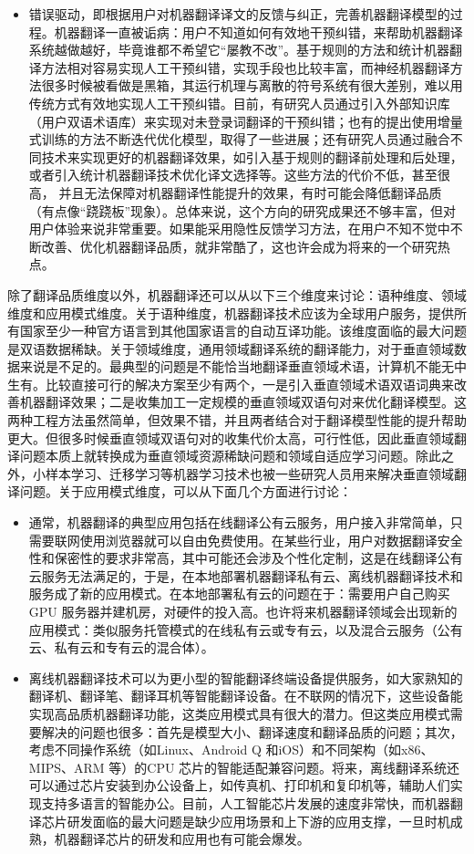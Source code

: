 \begin{spacing}{1.18}
\begin{itemize}
\item 错误驱动，即根据用户对机器翻译译文的反馈与纠正，完善机器翻译模型的过程。机器翻译一直被诟病：用户不知道如何有效地干预纠错，来帮助机器翻译系统越做越好，毕竟谁都不希望它“屡教不改”。基于规则的方法和统计机器翻译方法相对容易实现人工干预纠错，实现手段也比较丰富，而神经机器翻译方法很多时候被看做是黑箱，其运行机理与离散的符号系统有很大差别，难以用传统方式有效地实现人工干预纠错。目前，有研究人员通过引入外部知识库（用户双语术语库）来实现对未登录词翻译的干预纠错；也有的提出使用增量式训练的方法不断迭代优化模型，取得了一些进展；还有研究人员通过融合不同技术来实现更好的机器翻译效果，如引入基于规则的翻译前处理和后处理，或者引入统计机器翻译技术优化译文选择等。这些方法的代价不低，甚至很高， 并且无法保障对机器翻译性能提升的效果，有时可能会降低翻译品质（有点像“跷跷板”现象）。总体来说，这个方向的研究成果还不够丰富，但对用户体验来说非常重要。如果能采用隐性反馈学习方法，在用户不知不觉中不断改善、优化机器翻译品质，就非常酷了，这也许会成为将来的一个研究热点。
\end{itemize}

\parinterval 除了翻译品质维度以外，机器翻译还可以从以下三个维度来讨论：语种维度、领域维度和应用模式维度。关于语种维度，机器翻译技术应该为全球用户服务，提供所有国家至少一种官方语言到其他国家语言的自动互译功能。该维度面临的最大问题是双语数据稀缺。关于领域维度，通用领域翻译系统的翻译能力，对于垂直领域数据来说是不足的。最典型的问题是不能恰当地翻译垂直领域术语，计算机不能无中生有。比较直接可行的解决方案至少有两个，一是引入垂直领域术语双语词典来改善机器翻译效果；二是收集加工一定规模的垂直领域双语句对来优化翻译模型。这两种工程方法虽然简单，但效果不错，并且两者结合对于翻译模型性能的提升帮助更大。但很多时候垂直领域双语句对的收集代价太高，可行性低，因此垂直领域翻译问题本质上就转换成为垂直领域资源稀缺问题和领域自适应学习问题。除此之外，小样本学习、迁移学习等机器学习技术也被一些研究人员用来解决垂直领域翻译问题。关于应用模式维度，可以从下面几个方面进行讨论：
\begin{itemize}
\item 通常，机器翻译的典型应用包括在线翻译公有云服务，用户接入非常简单，只需要联网使用浏览器就可以自由免费使用。在某些行业，用户对数据翻译安全性和保密性的要求非常高，其中可能还会涉及个性化定制，这是在线翻译公有云服务无法满足的，于是，在本地部署机器翻译私有云、离线机器翻译技术和服务成了新的应用模式。在本地部署私有云的问题在于：需要用户自己购买 GPU 服务器并建机房，对硬件的投入高。也许将来机器翻译领域会出现新的应用模式：类似服务托管模式的在线私有云或专有云，以及混合云服务（公有云、私有云和专有云的混合体）。

\item 离线机器翻译技术可以为更小型的智能翻译终端设备提供服务，如大家熟知的翻译机、翻译笔、翻译耳机等智能翻译设备。在不联网的情况下，这些设备能实现高品质机器翻译功能，这类应用模式具有很大的潜力。但这类应用模式需要解决的问题也很多：首先是模型大小、翻译速度和翻译品质的问题；其次，考虑不同操作系统（如Linux、Android Q 和iOS）和不同架构（如x86、MIPS、ARM 等）的CPU 芯片的智能适配兼容问题。将来，离线翻译系统还可以通过芯片安装到办公设备上，如传真机、打印机和复印机等，辅助人们实现支持多语言的智能办公。目前，人工智能芯片发展的速度非常快，而机器翻译芯片研发面临的最大问题是缺少应用场景和上下游的应用支撑，一旦时机成熟，机器翻译芯片的研发和应用也有可能会爆发。


\end{itemize}
\end{spacing}
